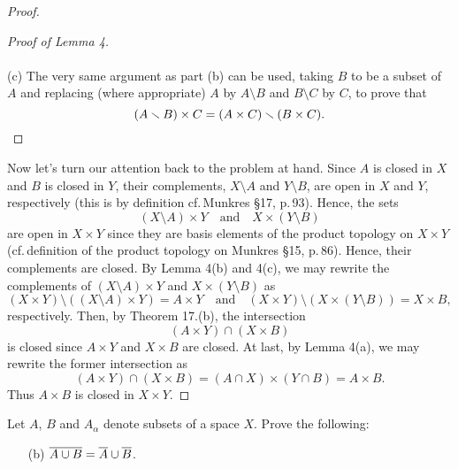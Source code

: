 \begin{proof}
\begin{proof}[Proof of Lemma 4]
\\\\
(c) The very same argument as part (b) can be used, taking $B$ to
be a subset of $A$ and replacing (where appropriate) $A$ by
$A\setminus B$ and $B\setminus C$ by $C$, to prove that
\[
(A\setminus B)\times C=(A\times C)\setminus (B\times C).\qedhere
\]
\end{proof}
\noindent
Now let's turn our attention back to the problem at hand. Since
$A$ is closed in $X$ and $B$ is closed in $Y$, their complements,
$X\setminus A$ and $Y\setminus B$, are open in $X$ and $Y$,
respectively (this is by definition cf.\,Munkres \S17,
p.\,93). Hence, the sets
\[
(X\setminus A)\times Y
\quad
\text{and}
\quad
X\times (Y\setminus B)
\]
are open in $X\times Y$ since they are basis elements of the
product topology on $X\times Y$ (cf.\,definition of the product
topology on Munkres \S15, p.\,86). Hence, their complements are
closed. By Lemma 4(b) and 4(c), we may rewrite the complements of
$(X\setminus A)\times Y$ and $X\times(Y\setminus B)$ as
\[
(X\times Y)\setminus((X\setminus A)\times Y)=A\times Y
\quad
\text{and}
\quad
(X\times Y)\setminus(X\times (Y\setminus B))=X\times B,
\]
respectively. Then, by Theorem 17.(b), the intersection
\[
(A\times Y)\cap (X\times B)
\]
is closed since $A\times Y$ and $X\times B$ are closed. At last,
by Lemma 4(a), we may rewrite the former intersection as
\[
(A\times Y)\cap (X\times B)=(A\cap X)\times (Y\cap B)=A\times B.
\]
Thus $A\times B$ is closed in $X\times Y$.
\end{proof}
\newpage
\begin{problem}
Let $A$, $B$ and $A_\alpha$ denote subsets of a space $X$. Prove
the following:
\begin{enumerate}[noitemsep]
\item[(b)] $\clsr{A\cup B}=\clsr A\cup\clsr B$.
\end{enumerate}
\end{problem}
